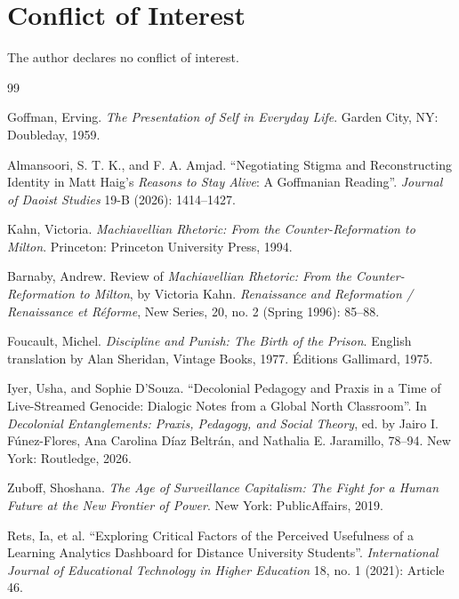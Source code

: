 \documentclass[10pt]{article}
\begin{document}
\newpage
\section*{Conflict of Interest}
The author declares no conflict of interest.

\begin{thebibliography}{99}
\setlength{\itemsep}{0.6em}

 Goffman, Erving. \emph{The Presentation of Self in Everyday Life}. Garden City, NY: Doubleday, 1959.

 Almansoori, S. T. K., and F. A. Amjad. ``Negotiating Stigma and Reconstructing Identity in Matt Haig's \emph{Reasons to Stay Alive}: A Goffmanian Reading''. \emph{Journal of Daoist Studies} 19-B (2026): 1414--1427.

 Kahn, Victoria. \emph{Machiavellian Rhetoric: From the Counter-Reformation to Milton}. Princeton: Princeton University Press, 1994.

 Barnaby, Andrew. Review of \emph{Machiavellian Rhetoric: From the Counter-Reformation to Milton}, by Victoria Kahn. \emph{Renaissance and Reformation / Renaissance et R\'eforme}, New Series, 20, no. 2 (Spring 1996): 85--88.

 Foucault, Michel. \emph{Discipline and Punish: The Birth of the Prison}. English translation by Alan Sheridan, Vintage Books, 1977. \'Editions Gallimard, 1975.

 Iyer, Usha, and Sophie D'Souza. ``Decolonial Pedagogy and Praxis in a Time of Live-Streamed Genocide: Dialogic Notes from a Global North Classroom''. In \emph{Decolonial Entanglements: Praxis, Pedagogy, and Social Theory}, ed. by Jairo I. F\'unez-Flores, Ana Carolina D\'iaz Beltr\'an, and Nathalia E. Jaramillo, 78--94. New York: Routledge, 2026.

 Zuboff, Shoshana. \emph{The Age of Surveillance Capitalism: The Fight for a Human Future at the New Frontier of Power}. New York: PublicAffairs, 2019.

 Rets, Ia, et al. ``Exploring Critical Factors of the Perceived Usefulness of a Learning Analytics Dashboard for Distance University Students''. \emph{International Journal of Educational Technology in Higher Education} 18, no. 1 (2021): Article 46.


\end{thebibliography}
\end{document}
